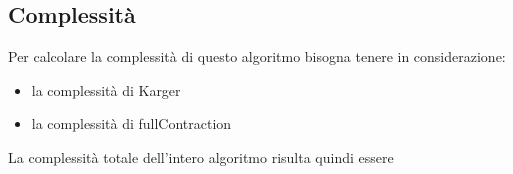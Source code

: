 \subsection{Complessità}

	Per calcolare la complessità di questo algoritmo bisogna tenere in considerazione:
	\begin{itemize}
		\item la complessità di Karger
		\item la complessità di fullContraction
	\end{itemize}
	La complessità totale dell'intero algoritmo risulta quindi essere

\pagebreak